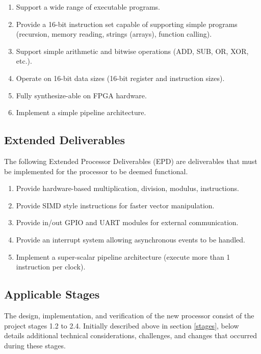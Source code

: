 \documentclass[11pt,a4paper]{report}
\begin{document}
\begin{enumerate}[label=\bfseries CPD\arabic*.]
\item{Support a wide range of executable programs.}
\item{Provide a 16-bit instruction set capable of supporting simple programs (recursion, memory reading, strings (arrays), function calling).}
\item{Support simple arithmetic and bitwise operations (ADD, SUB, OR, XOR, etc.).}
\item{Operate on 16-bit data sizes (16-bit register and instruction sizes).}
\item{Fully synthesize-able on FPGA hardware.}
\item{Implement a simple pipeline architecture.}
\end{enumerate}

\subsection{Extended Deliverables}
The following Extended Processor Deliverables (EPD) are deliverables that must be implemented for the processor to be deemed functional.
\begin{enumerate}[label=\bfseries EPD\arabic*.]
\item{Provide hardware-based multiplication, division, modulus, instructions.}
\item{Provide SIMD style instructions for faster vector manipulation.}
\item{Provide in/out GPIO and UART modules for external communication.}
\item{Provide an interrupt system allowing asynchronous events to be handled.}
\item{Implement a super-scalar pipeline architecture (execute more than 1 instruction per clock).}
\end{enumerate}

\subsection{Applicable Stages}
The design, implementation, and verification of the new processor consist of the  project stages 1.2 to 2.4. Initially described above in section \ref{stages}, below details additional technical considerations, challenges, and changes that occurred during these stages.
\end{document}

